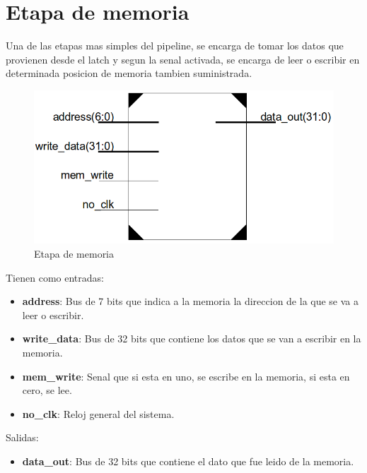 \section{Etapa de memoria}
Una de las etapas mas simples del pipeline, se encarga de tomar los datos que provienen desde el latch y segun la senal activada, se encarga de leer o escribir en determinada posicion de memoria tambien suministrada.

\begin{figure}[H]
\centering
\includegraphics[scale=0.35]{img/mem_stage}
\caption{Etapa de memoria}
\label{fig:mem_stage}
\end{figure}

Tienen como entradas:
\begin{itemize}
  \item \textbf{address}:  Bus de 7 bits que indica a la memoria la direccion de la que se va a leer o escribir.
  \item  \textbf{write\_data}: Bus de 32 bits que contiene los datos que se van a escribir en la memoria.
  \item \textbf{mem\_write}: Senal que si esta en uno, se escribe en la memoria, si esta en cero, se lee.
  \item \textbf{no\_clk}: Reloj general del sistema. 
\end{itemize}

Salidas:

\begin{itemize}
  \item \textbf{data\_out}: Bus de 32 bits que contiene el dato que fue leido de la memoria.
\end{itemize}